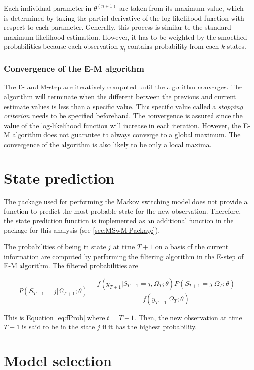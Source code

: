 Each individual parameter in $\theta^{(n+1)}$ are taken from its
maximum value, which is determined by taking the partial derivative
of the log-likelihood function with respect to each parameter. Generally,
this process is similar to the standard maximum likelihood estimation.
However, it has to be weighted by the smoothed probabilities because
each observation $y_{t}$ contains probability from each $k$ states. 

\subsubsection{Convergence of the E-M algorithm}

The E- and M-step are iteratively computed until the algorithm converges.
The algorithm will terminate when the different between the previous
and current estimate values is less than a specific value. This specific
value called a \emph{stopping criterion} needs to be specified beforehand.
The convergence is assured since the value of the log-likelihood function
will increase in each iteration. However, the E-M algorithm does not
guarantee to always converge to a global maximum. The convergence
of the algorithm is also likely to be only a local maxima. 

\section{State prediction}

The package used for performing the Markov switching model does not
provide a function to predict the most probable state for the new
observation. Therefore, the state prediction function is implemented
as an additional function in the package for this analysis (see \ref{sec:MSwM-Package}).

The probabilities of being in state $j$ at time $T+1$ on a basis
of the current information are computed by performing the filtering
algorithm in the E-step of E-M algorithm. The filtered probabilities
are

\[
P(S_{T+1}=j|\Omega_{T+1};\theta)=\frac{f(y_{T+1}|S_{T+1}=j,\Omega_{T};\theta)P(S_{T+1}=j|\Omega_{T};\theta)}{f(y_{T+1}|\Omega_{T};\theta)}
\]

This is Equation \ref{eq:fProb} where $t=T+1$. Then, the new observation
at time $T+1$ is said to be in the state $j$ if it has the highest
probability.

\section{Model selection}

